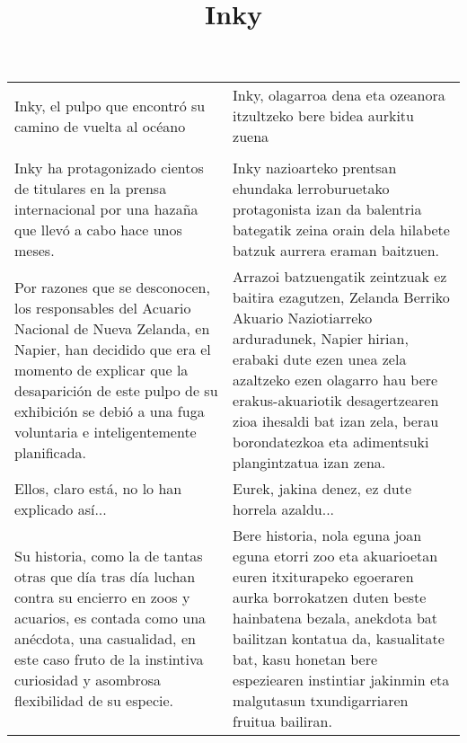 \documentclass{article}
\title{Inky}
\author{}
\date{}
\begin{document}
\maketitle


\begin{center}
\begin{longtable}{|p{6cm}|p{6cm}|}
  \toprule
  \cellcolor{lightgray}{\textbf{Título}} &
  \cellcolor{lightgray}{\textbf{Izenburua}}\\
  
  \midrule
  Inky, el pulpo que encontró su camino de vuelta al océano&
  Inky, olagarroa dena eta ozeanora itzultzeko bere bidea aurkitu zuena\\

  \midrule
  \cellcolor{lightgray}{\textbf{Párrafo}} &
  \cellcolor{lightgray}{\textbf{Paragrafoa}}\\
  
  \midrule
  Inky ha protagonizado cientos de titulares en la prensa internacional por una hazaña que llevó a cabo hace unos meses.&
  Inky nazioarteko prentsan ehundaka lerroburuetako protagonista izan da balentria bategatik zeina orain dela hilabete batzuk aurrera eraman baitzuen.\\

  \midrule
  Por razones que se desconocen, los responsables del Acuario Nacional de Nueva Zelanda, en Napier, han decidido que era el momento de explicar que la desaparición de este pulpo de su exhibición se debió a una fuga voluntaria e inteligentemente planificada.&
  Arrazoi batzuengatik zeintzuak ez baitira ezagutzen, Zelanda Berriko Akuario Naziotiarreko arduradunek, Napier hirian, erabaki dute ezen unea zela azaltzeko ezen olagarro hau bere erakus-akuariotik desagertzearen zioa ihesaldi bat izan zela, berau borondatezkoa eta adimentsuki plangintzatua izan zena.\\

  \midrule
  Ellos, claro está, no lo han explicado así...&
  Eurek, jakina denez, ez dute horrela azaldu...\\

  \midrule
  Su historia, como la de tantas otras que día tras día luchan contra su encierro en zoos y acuarios, es contada como una anécdota, una casualidad, en este caso fruto de la instintiva curiosidad y asombrosa flexibilidad de su especie.&
  Bere historia, nola eguna joan eguna etorri zoo eta akuarioetan euren itxiturapeko egoeraren aurka borrokatzen duten beste hainbatena bezala, anekdota bat bailitzan kontatua da, kasualitate bat, kasu honetan bere espeziearen instintiar jakinmin eta malgutasun txundigarriaren fruitua bailiran.\\


\end{longtable}
\end{center}
\end{document}
